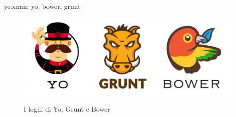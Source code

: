 yeoman: yo, bower, grunt




\begin{figure}[h]
\centering
\includegraphics[width=0.7\linewidth]{./img/yo-grunt-bower.png}
\caption[I loghi di Yo, Grunt e Bower]{I loghi di Yo, Grunt e Bower}
\label{fig:yo-grunt-bower}
\end{figure}

